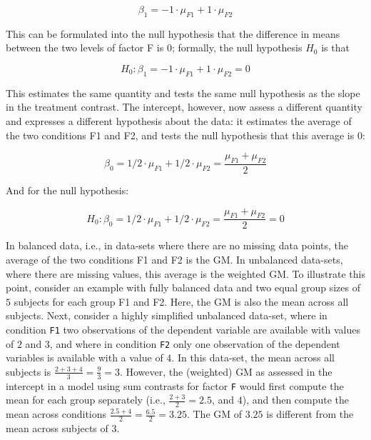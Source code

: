 \documentclass[12pt,]{krantz}
\theoremstyle{definition}
\theoremstyle{definition}
\theoremstyle{definition}
\theoremstyle{remark}
\begin{document}
\begin{equation}
\beta_1 = -1 \cdot \mu_{F1} + 1 \cdot \mu_{F2}
\end{equation}

\noindent
This can be formulated into the null hypothesis that the difference in means between the two levels of factor F is 0; formally, the null hypothesis \(H_0\) is that

\begin{equation}
H_0: \beta_1 = -1 \cdot \mu_{F1} + 1 \cdot \mu_{F2} = 0
\end{equation}

\noindent
This estimates the same quantity and tests the same null hypothesis as the slope in the treatment contrast.
The intercept, however, now assess a different quantity and expresses a different hypothesis about the data: it estimates the average of the two conditions F1 and F2, and tests the null hypothesis that this average is 0:

\begin{equation}
\beta_0 = 1/2 \cdot \mu_{F1} + 1/2 \cdot \mu_{F2} = \frac{\mu_{F1} + \mu_{F2}}{2}
\end{equation}

And for the null hypothesis:

\begin{equation}
H_0: \beta_0 = 1/2 \cdot \mu_{F1} + 1/2 \cdot \mu_{F2} = \frac{\mu_{F1} + \mu_{F2}}{2} = 0
\end{equation}

\noindent
In balanced data, i.e., in data-sets where there are no missing data points, the average of the two conditions F1 and F2 is the GM. In unbalanced data-sets, where there are missing values, this average is the weighted GM.
To illustrate this point, consider an example with fully balanced data and two equal group sizes of \(5\) subjects for each group F1 and F2. Here, the GM is also the mean across all subjects. Next, consider a highly simplified unbalanced data-set, where in condition \texttt{F1} two observations of the dependent variable are available with values of \(2\) and \(3\), and where in condition \texttt{F2} only one observation of the dependent variables is available with a value of \(4\). In this data-set, the mean across all subjects is \(\frac{2 + 3 + 4}{3} = \frac{9}{3} = 3\). However, the (weighted) GM as assessed in the intercept in a model using sum contrasts for factor \texttt{F} would first compute the mean for each group separately (i.e., \(\frac{2 + 3}{2} = 2.5\), and \(4\)), and then compute the mean across conditions \(\frac{2.5 + 4}{2} = \frac{6.5}{2} = 3.25\). The GM of \(3.25\) is different from the mean across subjects of \(3\).
\end{document}
